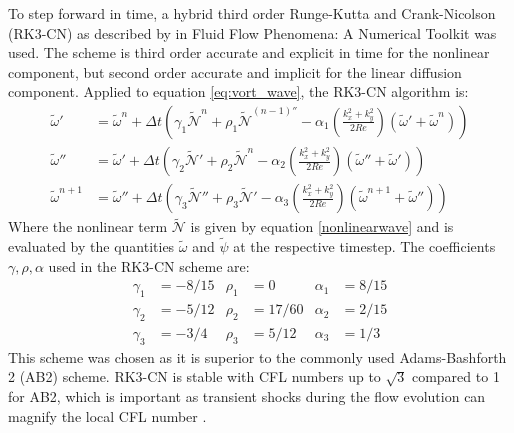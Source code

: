 \documentclass[conf]{new-aiaa}
\begin{document}
To step forward in time, a hybrid third order Runge-Kutta and Crank-Nicolson (RK3-CN) as described by \citeauthor{RK3CN} in Fluid Flow Phenomena: A Numerical Toolkit \cite{RK3CN} was used. The scheme is third order accurate and explicit in time for the nonlinear component, but second order accurate and implicit for the linear diffusion component. Applied to equation \eqref{eq:vort_wave}, the RK3-CN algorithm is:
\begin{equation}
    \begin{aligned}
        \tilde{\omega}' &= \tilde{\omega}^{n} + \Delta t(\gamma_{1}\tilde{\mathcal{N}}^{n} + \rho_{1}\tilde{\mathcal{N}}^{(n-1)''} - \alpha_{1} \left(\frac{k_{x}^{2}+k_{y}^{2}}{2Re}\right)(\tilde{\omega}'+\tilde{\omega}^{n}))\\
        \tilde{\omega}'' &= \tilde{\omega}' + \Delta t(\gamma_{2}\tilde{\mathcal{N}}' + \rho_{2}\tilde{\mathcal{N}}^{n} - \alpha_{2} \left(\frac{k_{x}^{2}+k_{y}^{2}}{2Re}\right)(\tilde{\omega}''+\tilde{\omega}'))\\
        \tilde{\omega}^{n+1} &= \tilde{\omega}'' + \Delta t(\gamma_{3}\tilde{\mathcal{N}}'' + \rho_{3}\tilde{\mathcal{N}}' - \alpha_{3} \left(\frac{k_{x}^{2}+k_{y}^{2}}{2Re}\right)(\tilde{\omega}^{n+1}+\tilde{\omega}''))
    \end{aligned}
\end{equation}
Where the nonlinear term $\tilde{\mathcal{N}}$ is given by equation \eqref{nonlinearwave} and is evaluated by the quantities $\tilde{\omega}$ and $\tilde{\psi}$ at the respective timestep. The coefficients $\gamma, \rho, \alpha$ used in the RK3-CN scheme are:
\begin{align*}
    \gamma_{1} &= -8/15 & \rho_{1} &= 0 & \alpha_{1} &= 8/15\\
    \gamma_{2} &= -5/12 & \rho_{2} &= 17/60 & \alpha_{2} &= 2/15\\
    \gamma_{3} &= -3/4 & \rho_{3} &= 5/12 & \alpha_{3} &= 1/3
\end{align*}
This scheme was chosen as it is superior to the commonly used Adams-Bashforth 2 (AB2) scheme. RK3-CN is stable with CFL numbers up to $\sqrt{3}$ compared to 1 for AB2, which is important as transient shocks during the flow evolution can magnify the local CFL number \cite{RK3CN}.
\end{document}
